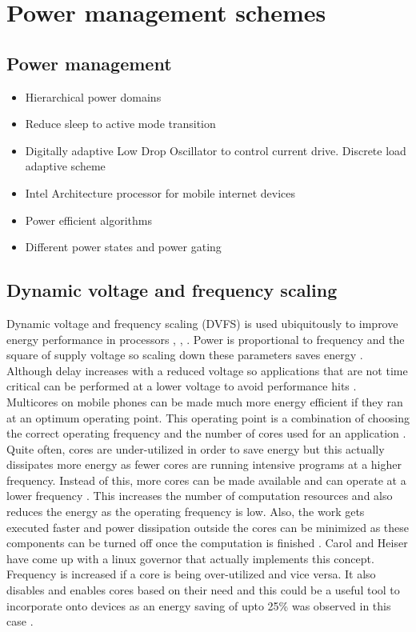 \documentclass[journal]{IEEEtran}
\begin{document}
\section{Power management schemes}
\subsection{Power management}
\begin{itemize}
	\item Hierarchical power domains \cite{HierarchicalPower}
	\item Reduce sleep to active mode transition \cite{LDO}
	\item Digitally adaptive Low Drop Oscillator to control current drive. Discrete load adaptive scheme \cite{LDO}
	\item Intel Architecture processor for mobile internet devices \cite{Intel}
	\item Power efficient algorithms \cite{Intel}
	\item Different power states and power gating \cite{Intel} 
\end{itemize}

\subsection{Dynamic voltage and frequency scaling}

Dynamic voltage and frequency scaling (DVFS) is used ubiquitously to improve energy performance in processors \cite{LinuxGov}, \cite{TempDVFS}, \cite{48Core}. Power is proportional to frequency and the square of supply voltage so scaling down these parameters saves energy \cite{TempDVFS}. Although delay increases with a reduced voltage so applications that are not time critical can be performed at a lower voltage to avoid performance hits \cite{LinuxGov}. Multicores on mobile phones can be made much more energy efficient if they ran at an optimum operating point. This operating point is a combination of choosing the correct operating frequency and the number of cores used for an application \cite{LinuxGov}. Quite often, cores are under-utilized in order to save energy but this actually dissipates more energy as fewer cores are running intensive programs at a higher frequency. Instead of this, more cores can be made available and can operate at a lower frequency \cite{LinuxGov}. This increases the number of computation resources and also reduces the energy as the operating frequency is low. Also, the work gets executed faster and power dissipation outside the cores can be minimized as these components can be turned off once the computation is finished \cite{LinuxGov}. Carol and Heiser \cite{LinuxGov} have come up with a linux governor that actually implements this concept. Frequency is increased if a core is being over-utilized and vice versa. It also disables and enables cores based on their need and this could be a useful tool to incorporate onto devices as an energy saving of upto 25\% was observed in this case \cite{LinuxGov}.\\
\end{document}
